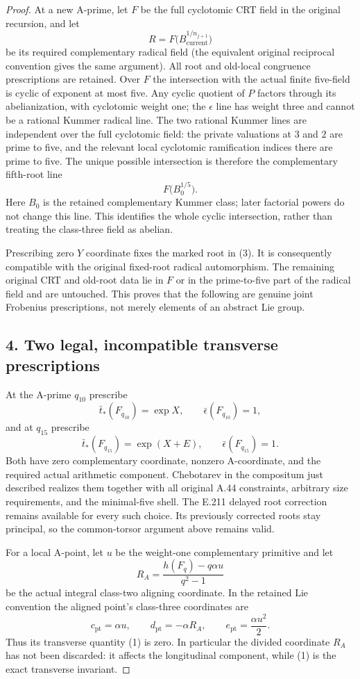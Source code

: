 \documentclass[11pt]{article}
\begin{document}
\begin{proof}
At a new A-prime, let $F$ be the full cyclotomic CRT field in the original recursion, and let
\[
 R=F\bigl(B_{\mathrm{current}}^{1/n_{j+1}}\bigr)
\]
be its required complementary radical field (the equivalent original reciprocal convention gives the same argument). All root and old-local congruence prescriptions are retained. Over $F$ the intersection with the actual finite five-field is cyclic of exponent at most five. Any cyclic quotient of $P$ factors through its abelianization, with cyclotomic weight one; the $\epsilon$ line has weight three and cannot be a rational Kummer radical line. The two rational Kummer lines are independent over the full cyclotomic field: the private valuations at $3$ and $2$ are prime to five, and the relevant local cyclotomic ramification indices there are prime to five. The unique possible intersection is therefore the complementary fifth-root line
\[
 F\bigl(B_0^{1/5}\bigr).
 \tag{3}
\]
Here $B_0$ is the retained complementary Kummer class; later factorial powers do not change this line. This identifies the whole cyclic intersection, rather than treating the class-three field as abelian.

Prescribing zero $Y$ coordinate fixes the marked root in (3). It is consequently compatible with the original fixed-root radical automorphism. The remaining original CRT and old-root data lie in $F$ or in the prime-to-five part of the radical field and are untouched. This proves that the following are genuine joint Frobenius prescriptions, not merely elements of an abstract Lie group.

\subsection*{4. Two legal, incompatible transverse prescriptions}
At the A-prime $q_{10}$ prescribe
\[
 \bar t_*(F_{q_{10}})=\exp X,\qquad
 \bar\epsilon(F_{q_{10}})=1,
\]
and at $q_{15}$ prescribe
\[
 \bar t_*(F_{q_{15}})=\exp(X+E),\qquad
 \bar\epsilon(F_{q_{15}})=1.
 \tag{4}
\]
Both have zero complementary coordinate, nonzero A-coordinate, and the required actual arithmetic component. Chebotarev in the compositum just described realizes them together with all original A.44 constraints, arbitrary size requirements, and the minimal-five shell. The E.211 delayed root correction remains available for every such choice. Its previously corrected roots stay principal, so the common-torsor argument above remains valid.

For a local A-point, let $u$ be the weight-one complementary primitive and let
\[
 R_A=\frac{h(F_q)-q\alpha u}{q^2-1}
\]
be the actual integral class-two aligning coordinate. In the retained Lie convention the aligned point's class-three coordinates are
\[
 c_{\mathrm{pt}}=\alpha u,\qquad
 d_{\mathrm{pt}}=-\alpha R_A,\qquad
 e_{\mathrm{pt}}=\frac{\alpha u^2}{2}.
 \tag{5}
\]
Thus its transverse quantity (1) is zero. In particular the divided coordinate $R_A$ has not been discarded: it affects the longitudinal component, while (1) is the exact transverse invariant.


\end{proof}
\end{document}

